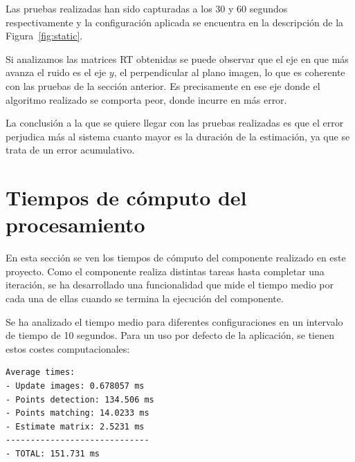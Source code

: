 %

Las pruebas realizadas han sido capturadas a los 30 y 60 segundos respectivamente y la configuración aplicada se encuentra en la descripción de la Figura~\ref{fig:static}.

Si analizamos las matrices RT obtenidas se puede observar que el eje en que más avanza el ruido es el eje $y$, el perpendicular al plano imagen, lo que es coherente con las pruebas de la sección anterior. Es precisamente en ese eje donde el algoritmo realizado se comporta peor, donde incurre en más error.

La conclusión a la que se quiere llegar con las pruebas realizadas es que el error perjudica más al sistema cuanto mayor es la duración de la estimación, ya que se trata de un error acumulativo.


\newpage
\section{Tiempos de cómputo del procesamiento}
En esta sección se ven los tiempos de cómputo del componente realizado en este proyecto. Como el componente realiza distintas tareas hasta completar una iteración, se ha desarrollado una funcionalidad que mide el tiempo medio por cada una de ellas cuando se termina la ejecución del componente.

Se ha analizado el tiempo medio para diferentes configuraciones en un intervalo de tiempo de 10 segundos. Para un uso por defecto de la aplicación, se tienen estos costes computacionales:

\begin{lstlisting}[style=CStyle]
Average times:
- Update images: 0.678057 ms
- Points detection: 134.506 ms
- Points matching: 14.0233 ms
- Estimate matrix: 2.5231 ms
-----------------------------
- TOTAL: 151.731 ms
\end{lstlisting}

